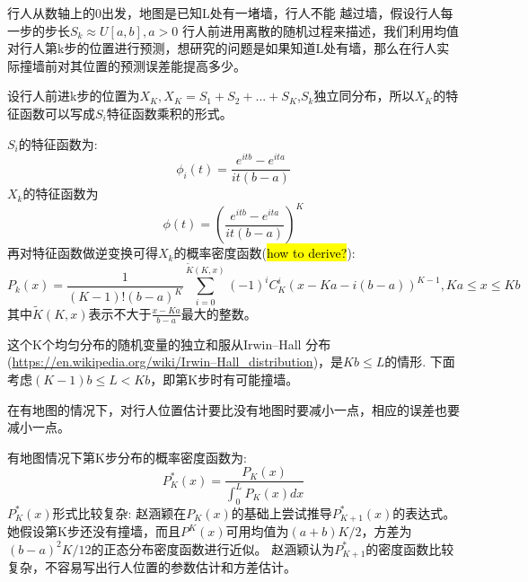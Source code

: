 \documentclass[12pt]{article}
\theoremstyle{remark}
\begin{document}
\title{\textbf{}} 

\author{}
\maketitle
\large
行人从数轴上的0出发，地图是已知L处有一堵墙，行人不能
越过墙，假设行人每一步的步长$S_k \approx U[a,b],a>0$
行人前进用离散的随机过程来描述，我们利用均值对行人第k步的位置进行预测，想研究的问题是如果知道L处有墙，那么在行人实际撞墙前对其位置的预测误差能提高多少。

设行人前进k步的位置为$X_K,X_K=S_1+S_2+...+S_K$,$S_k$独立同分布，所以$X_K$的特征函数可以写成$S_i$特征函数乘积的形式。

$S_i$的特征函数为:
\begin{equation}
\phi_i(t)=\frac{e^{itb}-e^{ita}}{it(b-a)}
\end{equation}
$X_k$的特征函数为
\begin{equation}
\phi(t)=(\frac{e^{itb}-e^{ita}}{it(b-a)})^K
\end{equation}
再对特征函数做逆变换可得$X_k$的概率密度函数(\hl{how to derive?}):
\begin{equation}
P_k(x)=\frac{1}{(K-1)!(b-a)^K}\sum_{i=0}^{\tilde{K}(K,x)}(-1)^i C^i_K (x-Ka-i(b-a))^{K-1},Ka \leq x \leq Kb
\end{equation}
其中$\tilde{K}(K,x)$表示不大于$\frac{x-Ka}{b-a}$最大的整数。

这个K个均匀分布的随机变量的独立和服从Irwin–Hall 分布(\url{https://en.wikipedia.org/wiki/Irwin–Hall\_distribution})，是$Kb \leq L$的情形.
下面考虑$(K-1)b\leq L <Kb$，即第K步时有可能撞墙。

在有地图的情况下，对行人位置估计要比没有地图时要减小一点，相应的误差也要减小一点。

有地图情况下第K步分布的概率密度函数为:
\begin{equation}
P^*_K(x)=\frac{P_K(x)}{\int_0^L P_K(x)dx}
\end{equation}
$P^*_K(x)$形式比较复杂:
赵涵颖在$P_K(x)$的基础上尝试推导$P^*_{K+1}(x)$的表达式。她假设第K步还没有撞墙，而且$P^K(x)$可用均值为$(a+b)K/2$，方差为$(b-a)^2K/12$的正态分布密度函数进行近似。
赵涵颖认为$P^*_{K+1}$的密度函数比较复杂，不容易写出行人位置的参数估计和方差估计。
\end{document}
